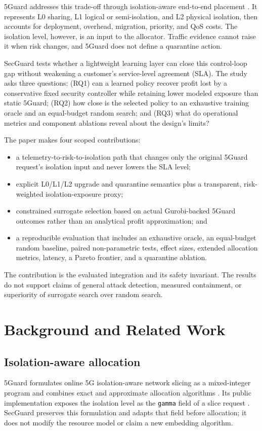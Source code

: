 \documentclass[conference]{IEEEtran}
\begin{document}
5Guard addresses this trade-off through isolation-aware end-to-end placement
\cite{bolourian2026fiveguard}. It represents L0 sharing, L1 logical or
semi-isolation, and L2 physical isolation, then accounts for deployment,
overhead, migration, priority, and QoS costs. The isolation level, however, is
an input to the allocator. Traffic evidence cannot raise it when risk changes,
and 5Guard does not define a quarantine action.

SecGuard tests whether a lightweight learning layer can close this control-loop
gap without weakening a customer's service-level agreement (SLA). The study
asks three questions: (RQ1) can a learned policy recover profit lost by a
conservative fixed security controller while retaining lower modeled exposure
than static 5Guard; (RQ2) how close is the selected policy to an exhaustive
training oracle and an equal-budget random search; and (RQ3) what do operational
metrics and component ablations reveal about the design's limits?

The paper makes four scoped contributions:
\begin{itemize}
  \item a telemetry-to-risk-to-isolation path that changes only the original
  5Guard request's isolation input and never lowers the SLA level;
  \item explicit L0/L1/L2 upgrade and quarantine semantics plus a transparent,
  risk-weighted isolation-exposure proxy;
  \item constrained surrogate selection based on actual Gurobi-backed 5Guard
  outcomes rather than an analytical profit approximation; and
  \item a reproducible evaluation that includes an exhaustive oracle, an
  equal-budget random baseline, paired non-parametric tests, effect sizes,
  extended allocation metrics, latency, a Pareto frontier, and a quarantine
  ablation.
\end{itemize}
The contribution is the evaluated integration and its safety invariant. The
results do not support claims of general attack detection, measured
containment, or superiority of surrogate search over random search.

\section{Background and Related Work}
\subsection{Isolation-aware allocation}
5Guard formulates online 5G isolation-aware network slicing as a mixed-integer
program and combines exact and approximate allocation algorithms
\cite{bolourian2026fiveguard}. Its public implementation exposes the isolation
level as the \texttt{gamma} field of a slice request \cite{fiveguardcode}.
SecGuard preserves this formulation and adapts that field before allocation;
it does not modify the resource model or claim a new embedding algorithm.
\end{document}
